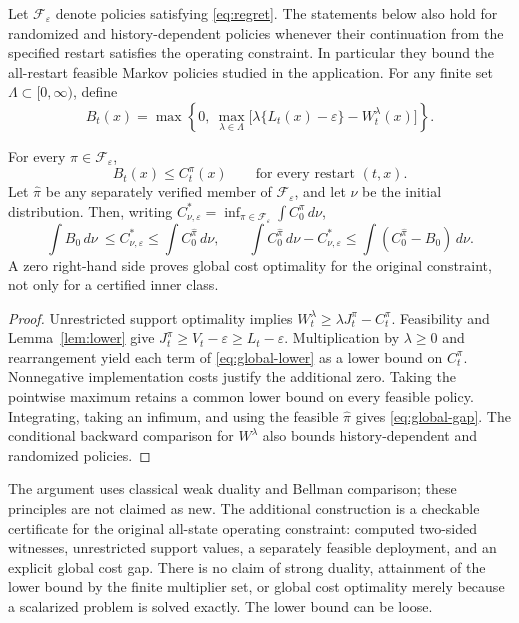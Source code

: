 Let $\mathcal F_\varepsilon$ denote policies satisfying \eqref{eq:regret}. The statements below also hold for randomized and history-dependent policies whenever their continuation from the specified restart satisfies the operating constraint. In particular they bound the all-restart feasible Markov policies studied in the application. For any finite set $\Lambda\subset[0,\infty)$, define
\begin{equation}\label{eq:global-lower}
 B_t(x)=\max\left\{0,\ \max_{\lambda\in\Lambda}
  \big[\lambda\{L_t(x)-\varepsilon\}-W_t^\lambda(x)\big]\right\}.
\end{equation}
\begin{theorem}\label{thm:global}
For every $\pi\in\mathcal F_\varepsilon$,
\begin{equation}\label{eq:global-bound}
 B_t(x)\le C_t^\pi(x)\qquad\text{for every restart }(t,x).
\end{equation}
Let $\widehat\pi$ be any separately verified member of $\mathcal F_\varepsilon$, and let $\nu$ be the initial distribution. Then, writing $C^*_{\nu,\varepsilon}=\inf_{\pi\in\mathcal F_\varepsilon}\int C_0^\pi\,d\nu$,
\begin{equation}\label{eq:global-gap}
 \int B_0\,d\nu\ \le C^*_{\nu,\varepsilon}\le\int C_0^{\widehat\pi}\,d\nu,
 \qquad
 \int C_0^{\widehat\pi}\,d\nu-C^*_{\nu,\varepsilon}
 \le\int(C_0^{\widehat\pi}-B_0)\,d\nu.
\end{equation}
A zero right-hand side proves global cost optimality for the original constraint, not only for a certified inner class.
\end{theorem}
\begin{proof}
Unrestricted support optimality implies
$W_t^\lambda\ge\lambda J_t^\pi-C_t^\pi$.
Feasibility and Lemma~\ref{lem:lower} give
$J_t^\pi\ge V_t-\varepsilon\ge L_t-\varepsilon$.
Multiplication by $\lambda\ge0$ and rearrangement yield each term of \eqref{eq:global-lower} as a lower bound on $C_t^\pi$. Nonnegative implementation costs justify the additional zero. Taking the pointwise maximum retains a common lower bound on every feasible policy. Integrating, taking an infimum, and using the feasible $\widehat\pi$ gives \eqref{eq:global-gap}. The conditional backward comparison for $W^\lambda$ also bounds history-dependent and randomized policies.\end{proof}

The argument uses classical weak duality and Bellman comparison; these principles are not claimed as new. The additional construction is a checkable certificate for the original all-state operating constraint: computed two-sided witnesses, unrestricted support values, a separately feasible deployment, and an explicit global cost gap. There is no claim of strong duality, attainment of the lower bound by the finite multiplier set, or global cost optimality merely because a scalarized problem is solved exactly. The lower bound can be loose.

